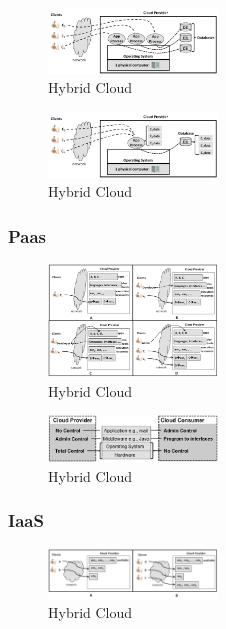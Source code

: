 \begin{figure}[H]
    \centering
	\includegraphics[width=0.4\textwidth]{Images/SaaSM1}
	\caption{Hybrid Cloud \cite{Badger}}
	\label{SaaSM1}
\end{figure}

\begin{figure}[H]
    \centering
	\includegraphics[width=0.4\textwidth]{Images/SaaSM2}
	\caption{Hybrid Cloud \cite{Badger}}
	\label{SaaSM2}
\end{figure}

\subsubsection{Paas}
\begin{figure}[H]
    \centering
	\includegraphics[width=0.4\textwidth]{Images/PaaSInteraction}
	\caption{Hybrid Cloud \cite{Badger}}
	\label{PaaSInteration}
\end{figure}

\begin{figure}[H]
    \centering
	\includegraphics[width=0.4\textwidth]{Images/PaaSControl}
	\caption{Hybrid Cloud \cite{Badger}}
	\label{PaaSControl}
\end{figure}

\subsubsection{IaaS}
\begin{figure}[H]
    \centering
	\includegraphics[width=0.4\textwidth]{Images/IaaSInteraction}
	\caption{Hybrid Cloud \cite{Badger}}
	\label{IaaSInteraction}
\end{figure}

